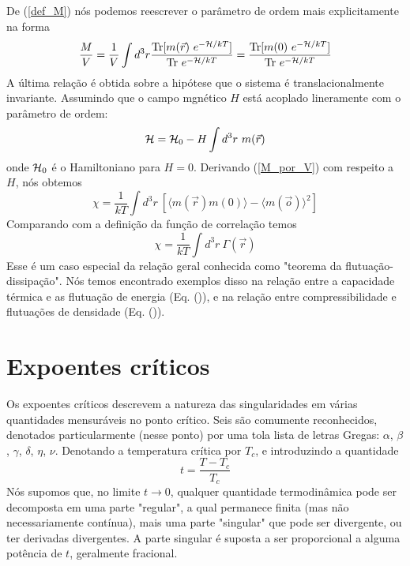 De (\ref{def_M}) nós podemos reescrever o parâmetro de ordem mais explicitamente na forma
\begin{equation}
\frac{M}{V}=\frac{1}{V} \int d^{3}r \frac{\text{Tr}[m(\vec{r})~e^{-{\cal H}/kT}]}{\text{Tr}~e^{-{\cal H}/kT}} = \frac{\text{Tr}[m(0)~e^{-{\cal H}/kT}]}{\text{Tr}~e^{-{\cal H}/kT}}
\label{M_por_V}
\end{equation}
A última relação é obtida sobre a hipótese que o sistema é translacionalmente invariante. Assumindo que o campo mgnético $H$ está acoplado lineramente com o parâmetro de ordem:
\begin{equation}
{\cal H}={\cal H}_{0}-H\int d^{3}r~m(\vec{r})
\end{equation}
onde ${\cal H}_{0}$ é o Hamiltoniano para $H=0$. Derivando (\ref{M_por_V}) com respeito a $H$, nós obtemos
\begin{equation}
\chi = \frac{1}{kT}\int d^{3}r ~ \left[\langle m(\vec{r}) m(0) \rangle- \langle m(\vec{o})\rangle^{2} \right]
\end{equation}
Comparando com a definição da função de correlação temos
\begin{equation}
\chi = \frac{1}{kT} \int d^{3}r~\Gamma(\vec{r})
\end{equation}
Esse é um caso especial da relação geral conhecida como "teorema da flutuação-dissipação". Nós temos encontrado exemplos disso na relação entre a capacidade térmica e as flutuação de energia (Eq. ()), e na relação entre compressibilidade e flutuações de densidade (Eq. ()).

\section{Expoentes cr\'iticos}
\noindent

Os expoentes críticos descrevem a natureza das singularidades em várias quantidades mensuráveis no ponto crítico. Seis são comumente reconhecidos, denotados particularmente (nesse ponto) por uma tola lista de letras Gregas: $\alpha$, $\beta$, $\gamma$, $\delta$, $\eta$, $\nu$. Denotando a temperatura crítica por $T_{c}$, e introduzindo a quantidade
\begin{equation}
t=\frac{T-T_{c}}{T_{c}}
\end{equation}
Nós supomos que, no limite $t \rightarrow 0$, qualquer quantidade termodinâmica pode ser decomposta em uma parte "regular", a qual permanece finita (mas não necessariamente contínua), mais uma parte "singular" que pode ser divergente, ou ter derivadas divergentes. A parte singular é suposta a ser proporcional a alguma potência de $t$, geralmente fracional.

